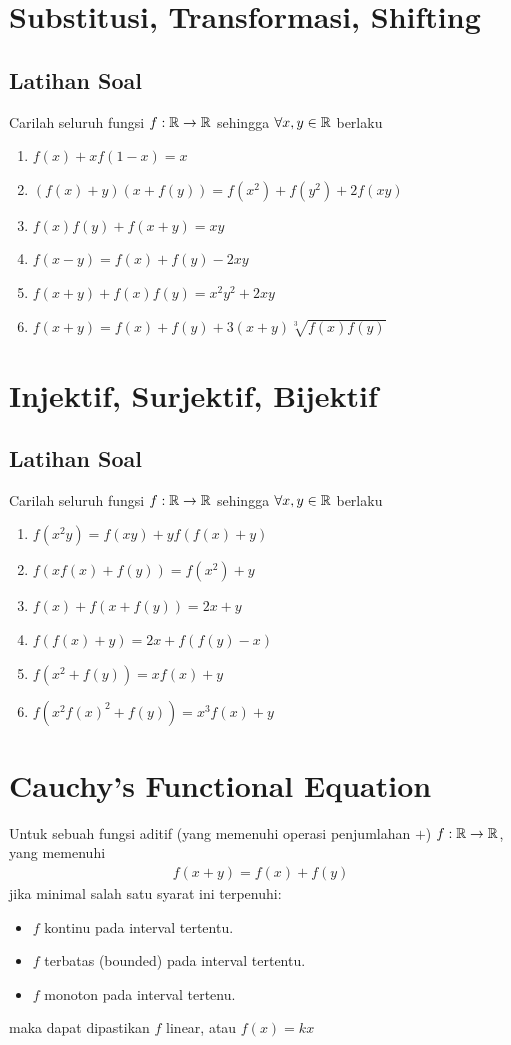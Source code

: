 \documentclass[12pt]{scrartcl}
\begin{document}
\section{Substitusi, Transformasi, Shifting}
\subsection{Latihan Soal}
Carilah seluruh fungsi $f:\mathbb R \to \mathbb R$ sehingga $\forall x,y \in \mathbb R$ berlaku
\begin{enumerate} 
    \item $f(x)+xf(1-x)=x$
    \item $(f(x)+y)(x+f(y))=f(x^2)+f(y^2)+2f(xy)$
    \item $f(x)f(y)+f(x+y)=xy$
    \item $f(x-y)=f(x)+f(y)-2xy$
    \item $f(x+y)+f(x)f(y)=x^2y^2+2xy$
    \item $f(x+y)=f(x)+f(y)+3(x+y)\sqrt[3]{f(x)f(y)}$
\end{enumerate}

\section{Injektif, Surjektif, Bijektif}
\subsection{Latihan Soal}
Carilah seluruh fungsi $f:\mathbb R \to \mathbb R$ sehingga $\forall x,y \in \mathbb R$ berlaku
\begin{enumerate} 
    \item $f(x^2y)=f(xy)+yf(f(x)+y)$
    \item $f(xf(x)+f(y))=f(x^2)+y$
    \item $f(x)+f(x+f(y))=2x+y$
    \item $f(f(x)+y)=2x+f(f(y)-x)$
    \item $f(x^2+f(y))=xf(x)+y$
    \item $f(x^2f(x)^2+f(y))=x^3f(x)+y$
\end{enumerate}

\section{Cauchy's Functional Equation}
Untuk sebuah fungsi aditif (yang memenuhi operasi penjumlahan $+$) $f:\mathbb R \to \mathbb R$, yang memenuhi
\begin{align*}
    f(x+y) = f(x)+f(y)
\end{align*}
jika minimal salah satu syarat ini terpenuhi:
\begin{itemize}
    \item $f$ kontinu pada interval tertentu.
    \item $f$ terbatas (bounded) pada interval tertentu.
    \item $f$ monoton pada interval tertenu.
\end{itemize}
maka dapat dipastikan $f$ linear, atau $f(x)=kx$
\end{document}
